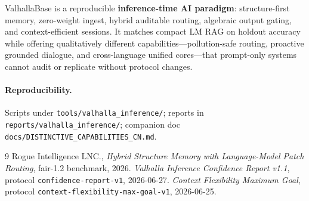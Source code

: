 \documentclass[11pt,a4paper]{article}
\begin{document}
ValhallaBase is a reproducible \textbf{inference-time AI paradigm}: structure-first memory, zero-weight ingest, hybrid auditable routing, algebraic output gating, and context-efficient sessions. It matches compact LM RAG on holdout accuracy while offering qualitatively different capabilities---pollution-safe routing, proactive grounded dialogue, and cross-language unified cores---that prompt-only systems cannot audit or replicate without protocol changes.

\paragraph{Reproducibility.}
Scripts under \texttt{tools/valhalla\_inference/}; reports in \texttt{reports/valhalla\_inference/}; companion doc \texttt{docs/DISTINCTIVE\_CAPABILITIES\_CN.md}.

\begin{thebibliography}{9}
Rogue Intelligence LNC.,
\textit{Hybrid Structure Memory with Language-Model Patch Routing},
fair-1.2 benchmark, 2026.
\textit{Valhalla Inference Confidence Report v1.1},
protocol \texttt{confidence-report-v1}, 2026-06-27.
\textit{Context Flexibility Maximum Goal},
protocol \texttt{context-flexibility-max-goal-v1}, 2026-06-25.
\end{thebibliography}
\end{document}
